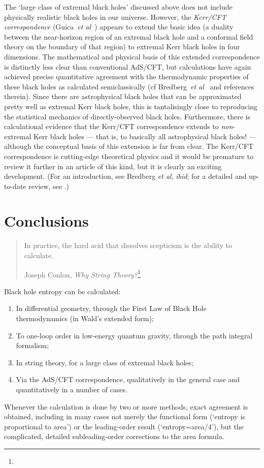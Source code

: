 \documentclass{article}
\begin{document}
The `large class of extremal black holes' discussed above does not include physically realistic black holes in our universe. However, the \emph{Kerr/CFT correspondence} (Guica~\emph{et al}~) appears to extend the basic idea (a duality between the near-horizon region of an extremal black hole and a conformal field theory on the boundary of that region) to extremal Kerr black holes in four dimensions. The mathematical and physical basis of this extended  correspondence is distinctly less clear than conventional AdS/CFT, but calculations have again achieved precise quantitative agreement with the thermodynamic properties of these black holes as calculated semiclassically (cf Bredberg~\emph{et al}~\citeyear{bredbergetal} and references therein). Since there are astrophysical black holes that can be approximated pretty well as extremal Kerr black holes, this is tantalisingly close to reproducing the statistical mechanics of directly-observed black holes. Furthermore, there is calculational evidence that the Kerr/CFT correspondence extends to \emph{non}-extremal Kerr black holes --- that is, to basically all astrophysical black holes! --- although the conceptual basis of this extension is far from clear. The Kerr/CFT correspondence is cutting-edge theoretical physics and it would be premature to review it further in an article of this kind, but it is clearly an exciting development. (For an introduction, see Bredberg \emph{et al}, \emph{ibid}; for a detailed and up-to-date review, see .)

\section{Conclusions}\label{conclusion}

\begin{quote}
In practice, the hard acid that dissolves scepticism is the ability to calculate.

\begin{flushright}
Joseph Conlon, \emph{Why String Theory?}\footnote{}
\end{flushright}
\end{quote}
Black hole entropy can be calculated:
\begin{enumerate}
\item In differential geometry, through the First Law of Black Hole thermodynamics (in Wald's extended form);
\item To one-loop order in low-energy quantum gravity, through the path integral formalism;
\item In string theory, for a large class of extremal black holes;
\item Via the AdS/CFT correspondence, qualitatively in the general case and quantitatively in a number of cases.
\end{enumerate}
Whenever the calculation is done by two or more methods, exact agreement is obtained, including in many cases not merely the functional form (`entropy is proportional to area') or the leading-order result (`entropy=area/4'), but the complicated, detailed subleading-order corrections to the area formula.
\end{document}
